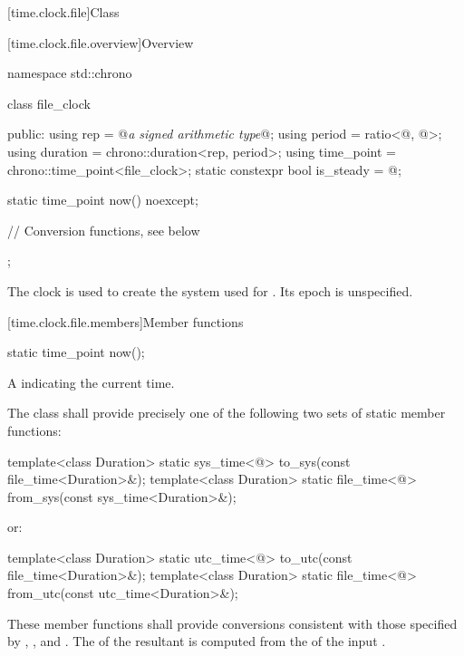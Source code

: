 [time.clock.file]{Class }

[time.clock.file.overview]{Overview}
%

\begin{codeblock}
namespace std::chrono {
  class file_clock {
  public:
    using rep                       = @\textit{a signed arithmetic type}@;
    using period                    = ratio<@\unspecnc@, @\unspec@>;
    using duration                  = chrono::duration<rep, period>;
    using time_point                = chrono::time_point<file_clock>;
    static constexpr bool is_steady = @\unspec@;

    static time_point now() noexcept;

    // Conversion functions, see below
  };
}
\end{codeblock}

\pnum
The clock  is used to create the  system
used for . Its epoch is unspecified.

[time.clock.file.members]{Member functions}

%
\begin{itemdecl}
static time_point now();
\end{itemdecl}

\begin{itemdescr}
\pnum
\returns A  indicating the current time.
\end{itemdescr}

\pnum
The class  shall provide
precisely one of the following two sets of static member functions:

\begin{codeblock}
template<class Duration>
  static sys_time<@\seebelow@>
    to_sys(const file_time<Duration>&);
template<class Duration>
  static file_time<@\seebelow@>
    from_sys(const sys_time<Duration>&);
\end{codeblock}

or:

\begin{codeblock}
template<class Duration>
  static utc_time<@\seebelow@>
    to_utc(const file_time<Duration>&);
template<class Duration>
  static file_time<@\seebelow@>
    from_utc(const utc_time<Duration>&);
\end{codeblock}

These member functions shall provide  conversions
consistent with those specified by
, , and .
The  of the resultant 
is computed from the  of the input .

